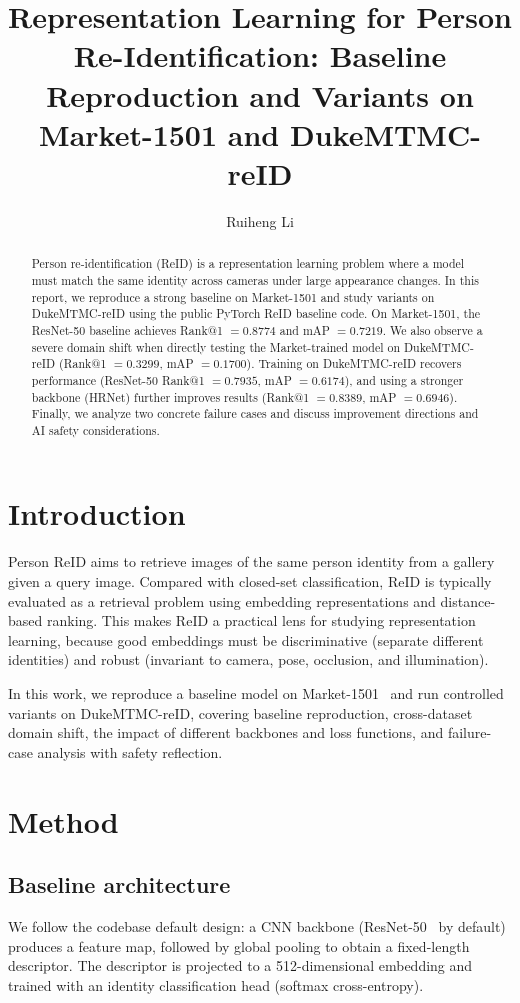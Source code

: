 \documentclass[sigconf,nonacm]{acmart}
\title{Representation Learning for Person Re-Identification: Baseline Reproduction and Variants on Market-1501 and DukeMTMC-reID}
\author{Ruiheng Li}
\affiliation{%
  \institution{FST, University of Macau, Macau, China}
  \city{Macau}
  \country{China}
}
\begin{document}
\begin{abstract}
Person re-identification (ReID) is a representation learning problem where a model must match the same identity across cameras under large appearance changes.
In this report, we reproduce a strong baseline on Market-1501 and study variants on DukeMTMC-reID using the public PyTorch ReID baseline code.
On Market-1501, the ResNet-50 baseline achieves Rank@1 $=0.8774$ and mAP $=0.7219$.
We also observe a severe domain shift when directly testing the Market-trained model on DukeMTMC-reID (Rank@1 $=0.3299$, mAP $=0.1700$).
Training on DukeMTMC-reID recovers performance (ResNet-50 Rank@1 $=0.7935$, mAP $=0.6174$), and using a stronger backbone (HRNet) further improves results (Rank@1 $=0.8389$, mAP $=0.6946$).
Finally, we analyze two concrete failure cases and discuss improvement directions and AI safety considerations.
\end{abstract}


\maketitle

\section{Introduction}
Person ReID aims to retrieve images of the same person identity from a gallery given a query image.
Compared with closed-set classification, ReID is typically evaluated as a retrieval problem using embedding representations and distance-based ranking.
This makes ReID a practical lens for studying representation learning, because good embeddings must be discriminative (separate different identities) and robust (invariant to camera, pose, occlusion, and illumination).

In this work, we reproduce a baseline model on Market-1501~\cite{zheng2015scalable} and run controlled variants on DukeMTMC-reID, covering baseline reproduction, cross-dataset domain shift, the impact of different backbones and loss functions, and failure-case analysis with safety reflection.

\section{Method}
\subsection{Baseline architecture}
We follow the codebase default design: a CNN backbone (ResNet-50~\cite{he2016deep} by default) produces a feature map, followed by global pooling to obtain a fixed-length descriptor.
The descriptor is projected to a 512-dimensional embedding and trained with an identity classification head (softmax cross-entropy).
\end{document}
